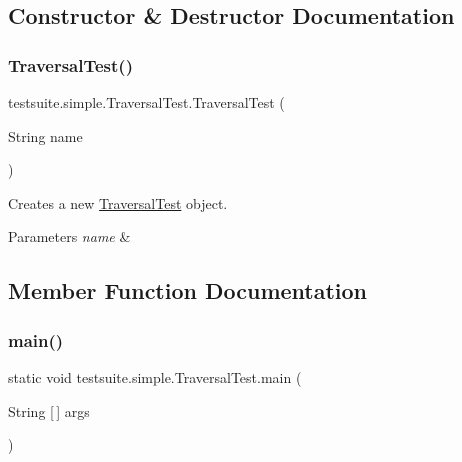 \subsection{Constructor \& Destructor Documentation}
\mbox{\label{classtestsuite_1_1simple_1_1_traversal_test_aab43c85339e7f465ad57bb3db55b6649}} 
\subsubsection{\texorpdfstring{Traversal\+Test()}{TraversalTest()}}
{\footnotesize\ttfamily testsuite.\+simple.\+Traversal\+Test.\+Traversal\+Test (\begin{DoxyParamCaption}\item[{String}]{name }\end{DoxyParamCaption})}

Creates a new \mbox{\hyperlink{classtestsuite_1_1simple_1_1_traversal_test}{Traversal\+Test}} object.


\begin{DoxyParams}{Parameters}
{\em name} & \\
\hline
\end{DoxyParams}


\subsection{Member Function Documentation}
\mbox{\label{classtestsuite_1_1simple_1_1_traversal_test_a26e0a3c13820f4daedefe73785a7fde8}} 
\subsubsection{\texorpdfstring{main()}{main()}}
{\footnotesize\ttfamily static void testsuite.\+simple.\+Traversal\+Test.\+main (\begin{DoxyParamCaption}\item[{String \mbox{[}$\,$\mbox{]}}]{args }\end{DoxyParamCaption})\hspace{0.3cm}{\ttfamily [static]}}

